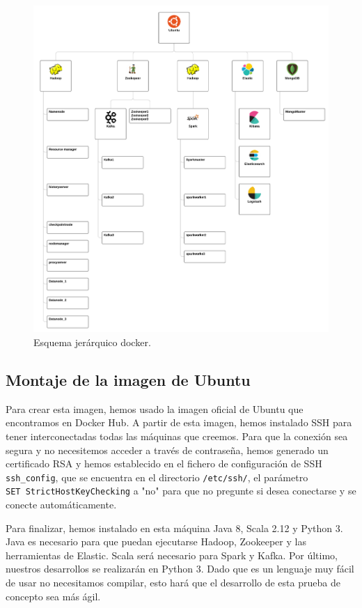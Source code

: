 \begin{figure}[htp]
\centering
\includegraphics[scale=0.45]{Imagenes/arqProp2.png}
\caption{Esquema jerárquico docker.}
\label{lmdarq2}
\end{figure}

\subsection{Montaje de la imagen de Ubuntu\label{montUbuntu}}

Para crear esta imagen, hemos usado la imagen oficial de Ubuntu que
encontramos en Docker Hub. A partir de esta imagen, hemos instalado SSH
para tener interconectadas todas las máquinas que creemos. Para que la
conexión sea segura y no necesitemos acceder a través de contraseña, hemos
generado un certificado RSA y hemos establecido en el fichero de
configuración de SSH {\tt ssh\_config}, que se encuentra en el directorio
{\tt /etc/ssh/}, el parámetro {\tt SET~StrictHostKeyChecking} a "no" para
que no pregunte si desea conectarse y se conecte automáticamente.

Para finalizar, hemos instalado en esta máquina Java 8, Scala 2.12 y Python
3. Java es necesario para que puedan ejecutarse Hadoop, Zookeeper y las
herramientas de Elastic. Scala será necesario para Spark y Kafka. Por
último, nuestros desarrollos se realizarán en Python 3. Dado que es un
lenguaje muy fácil de usar no necesitamos compilar, esto hará que el
desarrollo de esta prueba de concepto sea más ágil.

